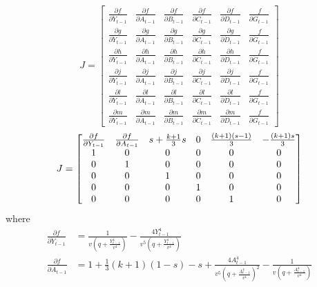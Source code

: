 \begin{equation*}
J = \begin{bmatrix}
    \frac{\partial f}{\partial \dot Y_{t-1}} & \frac{\partial f}{\partial \dot A_{t-1}} & \frac{\partial f}{\partial \dot B_{t-1}} & \frac{\partial f}{\partial \dot C_{t-1}} & \frac{\partial f}{\partial \dot D_{t-1}} & \frac{\ f}{\partial \dot G_{t-1}}\\
    \frac{\partial g}{\partial \dot Y_{t-1}} & \frac{\partial g}{\partial \dot A_{t-1}} & \frac{\partial g}{\partial \dot B_{t-1}} & \frac{\partial g}{\partial \dot C_{t-1}} & \frac{\partial g}{\partial \dot D_{t-1}} & \frac{\ f}{\partial \dot G_{t-1}}\\
    \frac{\partial h}{\partial \dot Y_{t-1}} & \frac{\partial h}{\partial \dot A_{t-1}} & \frac{\partial h}{\partial \dot B_{t-1}} & \frac{\partial h}{\partial \dot C_{t-1}} & \frac{\partial h}{\partial \dot D_{t-1}} & \frac{\ f}{\partial \dot G_{t-1}}\\
    \frac{\partial j}{\partial \dot Y_{t-1}} & \frac{\partial j}{\partial \dot A_{t-1}} & \frac{\partial j}{\partial \dot B_{t-1}} & \frac{\partial j}{\partial \dot C_{t-1}} & \frac{\partial j}{\partial \dot D_{t-1}} & \frac{\ f}{\partial \dot G_{t-1}}\\
    \frac{\partial l}{\partial \dot Y_{t-1}} & \frac{\partial l}{\partial \dot A_{t-1}} & \frac{\partial l}{\partial \dot B_{t-1}} & \frac{\partial l}{\partial \dot C_{t-1}} & \frac{\partial l}{\partial \dot D_{t-1}} & \frac{\ f}{\partial \dot G_{t-1}}\\
    \frac{\partial m}{\partial \dot Y_{t-1}} & \frac{\partial m}{\partial \dot A_{t-1}} & \frac{\partial m}{\partial \dot B_{t-1}} & \frac{\partial m}{\partial \dot C_{t-1}} & \frac{\partial m}{\partial \dot D_{t-1}} & \frac{\ f}{\partial \dot G_{t-1}}
\end{bmatrix}
\label{eq:Jacobian}
\end{equation*}
\begin{equation}
J=
\begin{bmatrix}\small
    \frac{\partial f}{\partial Y_{t-1}} & \frac{\partial f}{\partial A_{t-1}} & s+\frac{k+1}{3}s & 0 & \frac{(k+1)(s-1)}{3} & -\frac{(k+1)s}{3}\\
    1 & 0 & 0 & 0 & 0 & 0\\
    0 & 1 & 0 & 0 & 0 & 0\\
    0 & 0 & 1 & 0 & 0 & 0\\
    0 & 0 & 0 & 1 & 0 & 0\\
    0 & 0 & 0 & 0 & 1 & 0
\end{bmatrix}
\end{equation}
where 
\begin{align*}
    \frac{\partial f}{\partial \dot Y_{t-1}}&= \frac{1}{v\left(q+\frac{Y_{t-1}^4}{v^4}\right)}-\frac{4Y_{t-1}^4}{v^5\left(q+\frac{Y_{t-1}^4}{v^4}\right)}\\
    \frac{\partial f}{\partial \dot A_{t-1}}&=1+\frac{1}{3}(k+1)(1-s)-s+\frac{4A_{t-1}^4}{v^5\left(q+\frac{A_{t-1}^4}{v^4}\right)^2}-\frac{1}{v\left(q+\frac{A_{t-1}^4}{v^4}\right)}
\end{align*}

